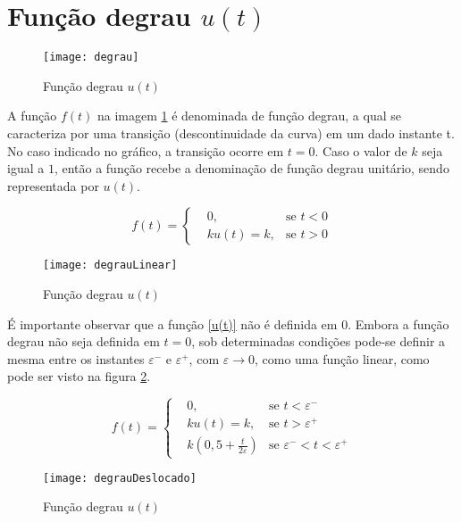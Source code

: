\documentclass[12pt,fleqn]{book} %
\begin{document}
   \section{Função degrau {$u(t)$}}
   
   \begin{figure}[!htbp] \centering\texttt{[image: degrau]}
            \caption{Função degrau $u(t)$}\label{degrau} 
        \end{figure} 

A função $f(t)$ na imagem \ref{degrau} é denominada de função degrau, a qual se caracteriza por uma transição (descontinuidade da curva) em um dado instante t. No caso indicado no gráfico, a transição ocorre em $t=0$. Caso o valor de $k$ seja igual a $1$, então a função recebe a denominação de função degrau unitário, sendo representada por $u(t)$.

\begin{equation}\label{u(t)}
f(t) =\left\{\begin{aligned}  & 
        0,&\text{se }t<0\\&       
        ku(t) = k,&\text{se }t>0
    \end{aligned}\right.
\end{equation}

\begin{figure}[!htbp] \centering\texttt{[image: degrauLinear]}
            \caption{Função degrau $u(t)$}\label{degrauLinear} 
        \end{figure}

É importante observar que a função \ref{u(t)} não é definida em 0. Embora a função degrau não seja definida em $t=0$, sob determinadas condições pode-se definir a mesma entre os instantes $\varepsilon^-$ e $\varepsilon^+$, com $\varepsilon\rightarrow0$, como uma função linear, como pode ser visto na figura \ref{degrauLinear}. 

\begin{equation}\label{u(t)}
f(t) =\left\{\begin{aligned}  & 
        0,&\text{se }t<\varepsilon^-\\&       
        ku(t) = k,&\text{se }t>\varepsilon^+\\&
        k(0,5+\frac{t}{2\varepsilon})&\text{se }\varepsilon^-<t<\varepsilon^+
    \end{aligned}\right.
\end{equation} 

\begin{figure}[!htbp] \centering\texttt{[image: degrauDeslocado]}
            \caption{Função degrau $u(t)$}\label{degrauDeslocado} 
        \end{figure}
\end{document}
